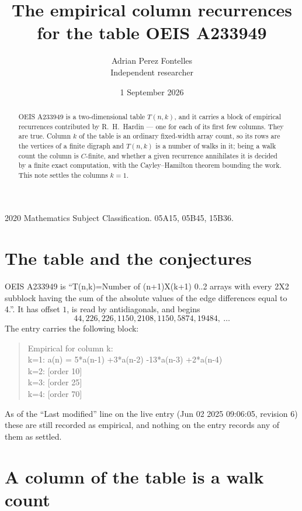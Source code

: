 \documentclass[11pt,a4paper]{article}
\title{The empirical column recurrences for the table OEIS A233949}
\author{Adrian Perez Fontelles\\ \small Independent researcher}
\date{1 September 2026}
\theoremstyle{plain}
\theoremstyle{definition}
\begin{document}
\maketitle

\begin{abstract}
OEIS A233949 is a two-dimensional table $T(n,k)$, and it carries a block of empirical
recurrences contributed by R.~H.~Hardin --- one for each of its first few columns. They are
true. Column $k$ of the table is an ordinary fixed-width array count, so its rows are the
vertices of a finite digraph and $T(n,k)$ is a number of walks in it; being a walk count the
column is $C$-finite, and whether a given recurrence annihilates it is decided by a finite
exact computation, with the Cayley--Hamilton theorem bounding the work. This note settles the
columns $k=1$.
\end{abstract}

\noindent\small 2020 Mathematics Subject Classification. 05A15, 05B45, 15B36.\normalsize

\section{The table and the conjectures}

OEIS A233949 is ``T(n,k)=Number of (n+1)X(k+1) 0..2 arrays with every 2X2 subblock having the sum of the absolute values of the edge differences equal to 4.''. It has offset $1$, is
read by antidiagonals, and begins
\[
44, 226, 226, 1150, 2108, 1150, 5874, 19484,\ \dots
\]
The entry carries the following block:
\begin{quote}\small
Empirical for column k:\\
k=1: a(n) = 5*a(n-1) +3*a(n-2) -13*a(n-3) +2*a(n-4)\\
k=2: [order 10]\\
k=3: [order 25]\\
k=4: [order 70]\\
\end{quote}
As of the ``Last modified'' line on the live entry (Jun 02 2025 09:06:05, revision 6) these are still
recorded as empirical, and nothing on the entry records any of them as settled.

\section{A column of the table is a walk count}
\end{document}
